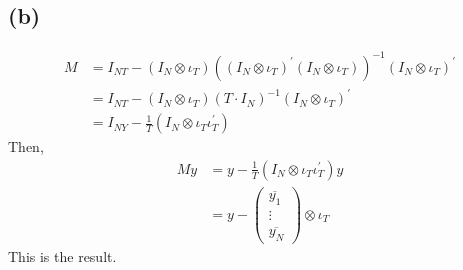 \documentclass{article}
\begin{document}
\subsection{(b)}
\begin{align*}
	M &= I_{NT} - \left( I_N \otimes \iota_T \right) \left( \left( I_N \otimes \iota_T \right)^{'} \left( I_N \otimes \iota_T \right) \right)^{-1} \left( I_N \otimes \iota_T \right)^{'}\\[8pt]
	&= I_{NT} - \left( I_N \otimes \iota_T \right)(T\cdot I_N)^{-1} \left( I_N \otimes \iota_T \right)^{'}\\[8pt]
	&= I_{NY} - \frac{1}{T}\left( I_N \otimes \iota_T\iota_T^{'}\right)
\end{align*}
Then,
\begin{align*}
	My &= y - \frac{1}{T}\left( I_N \otimes \iota_T\iota_T^{'}\right)y\\[8pt]
	&= y - \left(\begin{array}{cc} \overline{y_1}\\ \vdots \\ \overline{y_N} \end{array}\right) \otimes \iota_T
\end{align*}
This is the result.
\end{document}

